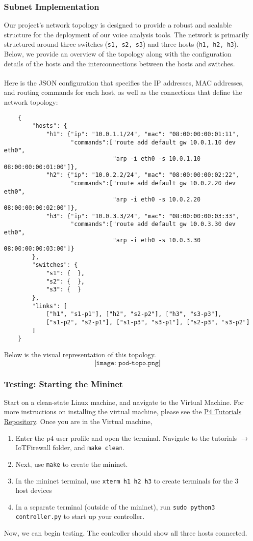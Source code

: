 \subsubsection{Subnet Implementation}
Our project's network topology is designed to provide a robust and scalable structure for the deployment of our voice analysis tools. The network is primarily structured around three switches (\verb|s1, s2, s3|) and three hosts (\verb|h1, h2, h3|). Below, we provide an overview of the topology along with the configuration details of the hosts and the interconnections between the hosts and switches.\\
\\
Here is the JSON configuration that specifies the IP addresses, MAC addresses, and routing commands for each host, as well as the connections that define the network topology:
\begin{lstlisting}
    {
        "hosts": {
            "h1": {"ip": "10.0.1.1/24", "mac": "08:00:00:00:01:11",
                   "commands":["route add default gw 10.0.1.10 dev eth0",
                               "arp -i eth0 -s 10.0.1.10 08:00:00:00:01:00"]},
            "h2": {"ip": "10.0.2.2/24", "mac": "08:00:00:00:02:22",
                   "commands":["route add default gw 10.0.2.20 dev eth0",
                               "arp -i eth0 -s 10.0.2.20 08:00:00:00:02:00"]},
            "h3": {"ip": "10.0.3.3/24", "mac": "08:00:00:00:03:33",
                   "commands":["route add default gw 10.0.3.30 dev eth0",
                               "arp -i eth0 -s 10.0.3.30 08:00:00:00:03:00"]}
        },
        "switches": {
            "s1": {  },
            "s2": {  },
            "s3": {  }
        },
        "links": [
            ["h1", "s1-p1"], ["h2", "s2-p2"], ["h3", "s3-p3"],
            ["s1-p2", "s2-p1"], ["s1-p3", "s3-p1"], ["s2-p3", "s3-p2"]
        ]
    }
\end{lstlisting}
Below is the visual representation of this topology.
$$
\texttt{[image: pod-topo.png]}
$$
\subsubsection{Testing: Starting the Mininet}
Start on a clean-state Linux machine, and navigate to the Virtual Machine. For more instructions on installing the virtual machine, please see the \href{https://github.com/p4lang/tutorials?tab=readme-ov-file#obtaining-required-software}{P4 Tutorials Repository}. Once you are in the Virtual machine,
\begin{enumerate}
    \item Enter the p$4$ user profile and open the terminal. Navigate to the tutorials $\rightarrow$ IoTFirewall folder, and \verb|make clean|.
    \item Next, use \verb|make| to create the mininet.
    \item In the mininet terminal, use \verb|xterm h1 h2 h3| to create terminals for the 3 host devices
    \item In a separate terminal (outside of the mininet), run \verb|sudo python3 controller.py| to start up your controller.
\end{enumerate}
Now, we can begin testing. The controller should show all three hosts connected.
